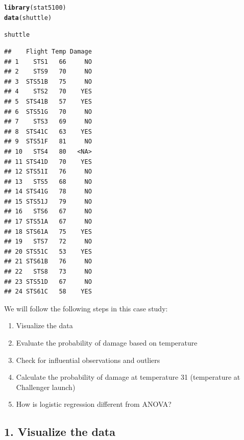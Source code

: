 \documentclass{article}\usepackage[]{graphicx}\usepackage[]{color}
\makeatletter
\newcommand{\hlstd}[1]{\textcolor[rgb]{0.345,0.345,0.345}{#1}}%
\newcommand{\hlkwd}[1]{\textcolor[rgb]{0.737,0.353,0.396}{\textbf{#1}}}%
\newenvironment{kframe}{%
 \def\at@end@of@kframe{}%
 \ifinner\ifhmode%
  \def\at@end@of@kframe{\end{minipage}}%
  \begin{minipage}{\columnwidth}%
 \fi\fi%
 \def\FrameCommand##1{\hskip\@totalleftmargin \hskip-\fboxsep
 \colorbox{shadecolor}{##1}\hskip-\fboxsep
     \hskip-\linewidth \hskip-\@totalleftmargin \hskip\columnwidth}%
 \MakeFramed {\advance\hsize-\width
   \@totalleftmargin\z@ \linewidth\hsize
   \@setminipage}}%
 {\par\unskip\endMakeFramed%
 \at@end@of@kframe}
\newenvironment{knitrout}{}{} %
\makeatother
\begin{document}
\begin{knitrout}
\color{fgcolor}\begin{kframe}
\begin{alltt}
\hlkwd{library}\hlstd{(stat5100)}
\hlkwd{data}\hlstd{(shuttle)}

\hlstd{shuttle}
\end{alltt}
\begin{verbatim}
##    Flight Temp Damage
## 1    STS1   66     NO
## 2    STS9   70     NO
## 3  STS51B   75     NO
## 4    STS2   70    YES
## 5  STS41B   57    YES
## 6  STS51G   70     NO
## 7    STS3   69     NO
## 8  STS41C   63    YES
## 9  STS51F   81     NO
## 10   STS4   80   <NA>
## 11 STS41D   70    YES
## 12 STS51I   76     NO
## 13   STS5   68     NO
## 14 STS41G   78     NO
## 15 STS51J   79     NO
## 16   STS6   67     NO
## 17 STS51A   67     NO
## 18 STS61A   75    YES
## 19   STS7   72     NO
## 20 STS51C   53    YES
## 21 STS61B   76     NO
## 22   STS8   73     NO
## 23 STS51D   67     NO
## 24 STS61C   58    YES
\end{verbatim}
\end{kframe}
\end{knitrout}

We will follow the following steps in this case study:

\begin{enumerate}
  \item Visualize the data
  \item Evaluate the probability of damage based on temperature
  \item Check for influential observations and outliers
  \item Calculate the probability of damage at temperature 31 (temperature at Challenger launch)
  \item How is logistic regression different from ANOVA?
\end{enumerate}

\subsection*{1. Visualize the data}
\end{document}
